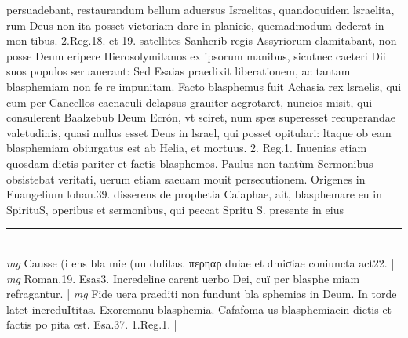 \documentclass{article}
\begin{document}
\begin{pages}
persuadebant, restaurandum bellum aduersus Israelitas, quandoquidem lsraelita, rum Deus non ita posset victoriam dare in planicie, quemadmodum dederat in mon tibus. 2.Reg.18. et 19. satellites Sanherib regis Assyriorum clamitabant, non posse Deum eripere Hierosolymitanos ex ipsorum manibus, sicutnec caeteri Dii suos populos seruauerant: Sed Esaias praedixit liberationem, ac tantam blasphemiam non fe re impunitam. Facto blasphemus fuit Achasia rex lsraelis, qui cum per Cancellos caenaculi delapsus grauiter aegrotaret, nuncios misit, qui consulerent Baalzebub Deum Ecrón, vt sciret, num spes superesset recuperandae valetudinis, quasi nullus esset Deus in lsrael, qui posset opitulari: ltaque ob eam blasphemiam obiurgatus est ab Helia, et mortuus. 2. Reg.1. Inuenias etiam quosdam dictis pariter et factis blasphemos. Paulus non tantùm Sermonibus obsistebat veritati, uerum etiam saeuam mouit persecutionem. Origenes in Euangelium lohan.39. disserens de prophetia Caiaphae, ait, blasphemare eu in SpirituS, operibus et sermonibus, qui peccat Spritu S. presente in eius  \pend
\vspace{0.5cm}\noindent
\vspace{0.2cm}\rule{1cm}{0.2pt}\\ 
\hspace{0.2cm}\textit{mg}
\footnotesize Causse (i ens bla mie (uu dulitas. περηαρ duiae et dmiσiae coniuncta act22. 
\normalsize| 
\hspace{0.2cm}\textit{mg}
\footnotesize Roman.19. Esas3. Incredeline carent uerbo Dei, cuï per blasphe miam refragantur. 
\normalsize| 
\hspace{0.2cm}\textit{mg}
\footnotesize Fide uera praediti non fundunt bla sphemias in Deum. In torde latet inereduItitas. Exoremanu blasphemia. Cafafoma us blasphemiaein dictis et factis po pita est. Esa.37. 1.Reg.1. 
\normalsize| 

\end{pages}
\end{document}
